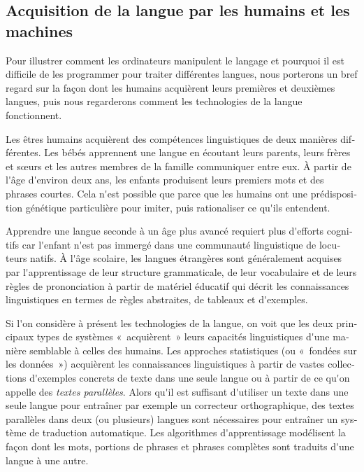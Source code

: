 \begin{french}
\begin{multicols}{2}

\subsection{Acquisition de la langue par les humains et les machines}

Pour illustrer comment les ordinateurs manipulent le langage et pourquoi
il est difficile de les programmer pour traiter différentes langues,
nous porterons un bref regard sur la façon dont les humains acquièrent
leurs premières et deuxièmes langues, puis nous regarderons comment
les technologies de la langue fonctionnent.

Les êtres humains acquièrent des compétences linguistiques de deux
manières différentes. Les bébés apprennent une langue en écoutant
leurs parents, leurs frères et sœurs et les autres membres de la
famille communiquer entre eux. À partir de l{\mbox '}âge d{\mbox
  '}environ deux ans, les enfants produisent leurs premiers mots et
des phrases courtes. Cela n{\mbox '}est possible que parce que les
humains ont une prédisposition génétique particulière pour imiter,
puis rationaliser ce qu{\mbox '}ils entendent.

Apprendre une langue seconde à un âge plus avancé requiert plus
d{\mbox '}efforts cognitifs car l{\mbox '}enfant n{\mbox '}est pas
immergé dans une communauté linguistique de locuteurs natifs. À
l{\mbox '}âge scolaire, les langues étrangères sont généralement
acquises par l{\mbox '}apprentissage de leur structure grammaticale,
de leur vocabulaire et de leurs règles de prononciation à partir de
matériel éducatif qui décrit les connaissances linguistiques en termes
de règles abstraites, de tableaux et d{\mbox '}exemples.


Si l{\mbox '}on considère à présent les technologies de la langue, on
voit que les deux principaux types de systèmes «~acquièrent~» leurs
capacités linguistiques d{\mbox '}une manière semblable à celles des
humains. Les approches statistiques (ou «~fondées sur les données~»)
acquièrent les connaissances linguistiques à partir de vastes
collections d{\mbox '}exemples concrets de texte dans une seule langue
ou à partir de ce qu{\mbox '}on appelle des {\em textes
  parallèles}. Alors qu{\mbox '}il est suffisant d{\mbox '}utiliser un
texte dans une seule langue pour entraîner par exemple un correcteur
orthographique, des textes parallèles dans deux (ou plusieurs) langues
sont nécessaires pour entraîner un système de traduction
automatique. Les algorithmes d{\mbox '}apprentissage modélisent la
façon dont les mots, portions de phrases et phrases complètes sont
traduits d{\mbox '}une langue à une autre.


\end{multicols}
\end{french}
